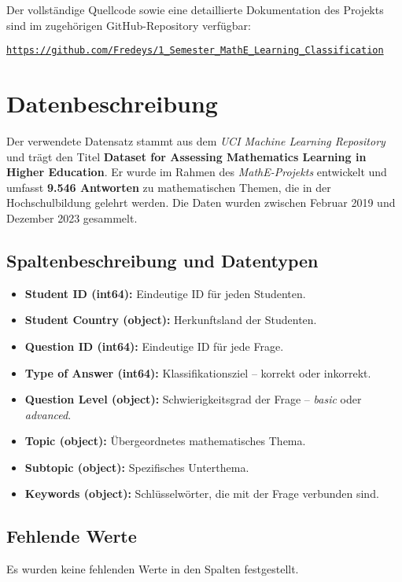 \documentclass[a4paper,12pt]{article}
\begin{document}
\noindent
Der vollständige Quellcode sowie eine detaillierte Dokumentation des Projekts sind im zugehörigen GitHub-Repository verfügbar: 

\begin{center}
    \href{https://github.com/Fredeys/1_Semester_MathE_Learning_Classification}{\texttt{https://github.com/Fredeys/1\_Semester\_MathE\_Learning\_Classification}}
\end{center}


\section{Datenbeschreibung}
Der verwendete Datensatz stammt aus dem \textit{UCI Machine Learning Repository} und trägt den Titel \textbf{Dataset for Assessing Mathematics Learning in Higher Education}. Er wurde im Rahmen des \textit{MathE-Projekts} entwickelt und umfasst \textbf{9.546 Antworten} zu mathematischen Themen, die in der Hochschulbildung gelehrt werden. Die Daten wurden zwischen Februar 2019 und Dezember 2023 gesammelt.

\subsection{Spaltenbeschreibung und Datentypen}
\begin{itemize}
    \item \textbf{Student ID (int64):} Eindeutige ID für jeden Studenten.
    \item \textbf{Student Country (object):} Herkunftsland der Studenten.
    \item \textbf{Question ID (int64):} Eindeutige ID für jede Frage.
    \item \textbf{Type of Answer (int64):} Klassifikationsziel – korrekt oder inkorrekt.
    \item \textbf{Question Level (object):} Schwierigkeitsgrad der Frage – \textit{basic} oder \textit{advanced}.
    \item \textbf{Topic (object):} Übergeordnetes mathematisches Thema.
    \item \textbf{Subtopic (object):} Spezifisches Unterthema.
    \item \textbf{Keywords (object):} Schlüsselwörter, die mit der Frage verbunden sind.
\end{itemize}

\subsection{Fehlende Werte}
Es wurden keine fehlenden Werte in den Spalten festgestellt.
\end{document}
